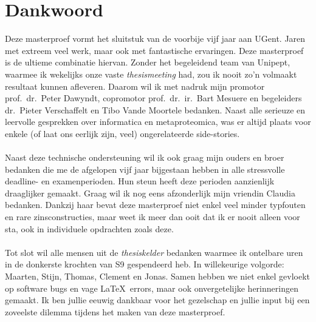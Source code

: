 \chapter*{Dankwoord}\label{ch:dankwoord}
Deze masterproef vormt het sluitstuk van de voorbije vijf jaar aan UGent.
Jaren met extreem veel werk, maar ook met fantastische ervaringen.
Deze masterproef is de ultieme combinatie hiervan.
Zonder het begeleidend team van Unipept, waarmee ik wekelijks onze vaste \textit{thesismeeting} had, zou ik nooit zo'n volmaakt resultaat kunnen afleveren.
Daarom wil ik met nadruk mijn promotor prof.~dr.~Peter Dawyndt, copromotor prof.~dr.~ir.~Bart Mesuere en begeleiders dr.~Pieter Verschaffelt en Tibo Vande Moortele bedanken.
Naast alle serieuze en leervolle gesprekken over informatica en metaproteomica, was er altijd plaats voor enkele (of laat ons eerlijk zijn, veel) ongerelateerde side-stories.
\\ \\
Naast deze technische ondersteuning wil ik ook graag mijn ouders en broer bedanken die me de afgelopen vijf jaar bijgestaan hebben in alle stressvolle deadline- en examenperioden.
Hun steun heeft deze perioden aanzienlijk draaglijker gemaakt.
Graag wil ik nog eens afzonderlijk mijn vriendin Claudia bedanken.
Dankzij haar bevat deze masterproef niet enkel veel minder typfouten en rare zinsconstructies, maar weet ik meer dan ooit dat ik er nooit alleen voor sta, ook in individuele opdrachten zoals deze.
\\ \\
Tot slot wil alle mensen uit de \textit{thesiskelder} bedanken waarmee ik ontelbare uren in de donkerste krochten van S9 gespendeerd heb.
In willekeurige volgorde: Maarten, Stijn, Thomas, Clement en Jonas.
Samen hebben we niet enkel gevloekt op software bugs en vage \LaTeX\ errors, maar ook onvergetelijke herinneringen gemaakt.
Ik ben jullie eeuwig dankbaar voor het gezelschap en jullie input bij een zoveelste dilemma tijdens het maken van deze masterproef.
